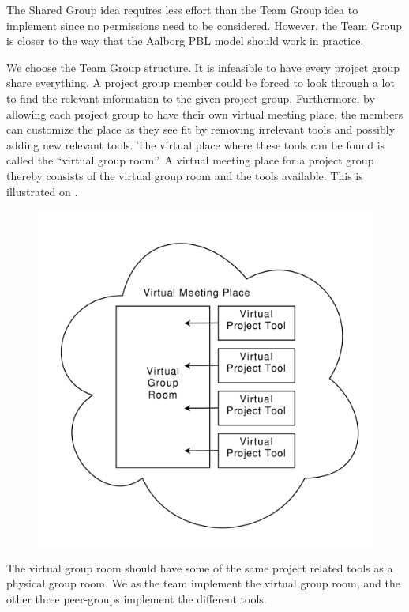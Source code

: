 The Shared Group idea requires less effort than the Team Group idea to implement since no permissions need to be considered.
However, the Team Group is closer to the way that the Aalborg PBL model should work in practice.

We choose the Team Group structure. 
It is infeasible to have every project group share everything.
A project group member could be forced to look through a lot to find the relevant information to the given project group.
Furthermore, by allowing each project group to have their own virtual meeting place, the members can customize the place as they see fit by removing irrelevant tools and possibly adding new relevant tools.
The virtual place where these tools can be found is called the ``virtual group room''.
A virtual meeting place for a project group thereby consists of the virtual group room and the tools available.
This is illustrated on .
\begin{figure}%
\center
\includegraphics[scale=0.50]{images/VirtualMeetingPlace}%
%
\label{fig:projectgrouproom}%
\end{figure}

The virtual group room should have some of the same project related tools as a physical group room.
We as the \administrationgroup{} team implement the virtual group room, and the other three peer-groups implement the different tools.


